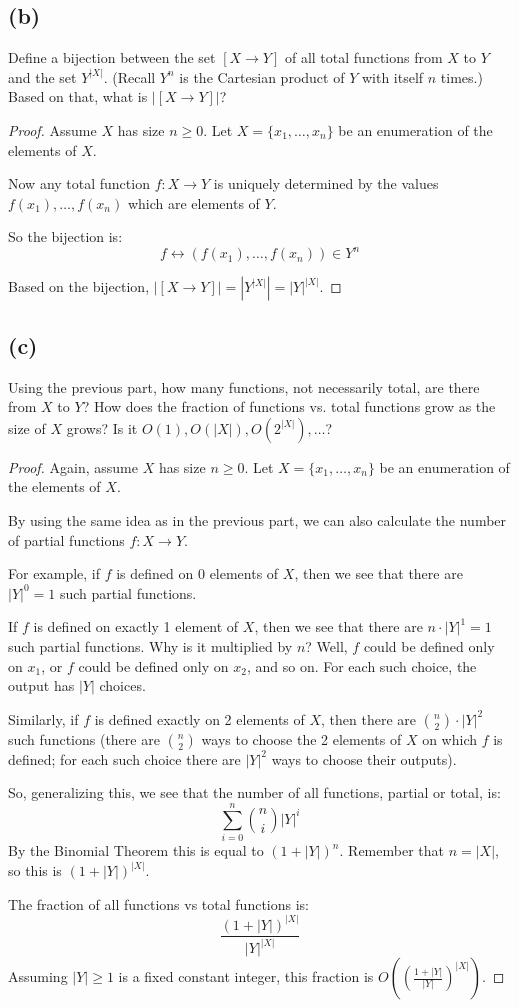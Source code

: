 \documentclass[14pt]{extarticle}
\begin{document}
\subsection{(b)}
Define a bijection between the set $[X \to Y]$ of all total functions from $X$ to $Y$ and the set $Y^{|X|}$. (Recall $Y^n$ is the Cartesian product of $Y$ with itself $n$ times.) Based on that, what is $|[X \to Y]|$?
\begin{proof}
Assume $X$ has size $n\geq 0$. Let $X = \{x_1, \ldots, x_n\}$ be an enumeration of the elements of $X$. 

Now any total function $f: X \to Y$ is uniquely determined by the values\\ $f(x_1),  \ldots, f(x_n)$ which are elements of $Y$.

So the bijection is:
$$
f \longleftrightarrow (f(x_1), \ldots, f(x_n)) \in Y^n
$$

Based on the bijection, $|[X \to Y]| = |Y^{|X|}| = |Y|^{|X|}$.
\end{proof}

\subsection{(c)}
Using the previous part, how many functions, not necessarily total, are there from $X$ to $Y$? How does the fraction of functions vs. total functions grow as the size of $X$ grows? Is it $O(1), O(|X|), O(2^{|X|}), \ldots$?
\begin{proof}
Again, assume $X$ has size $n\geq 0$. Let $X = \{x_1, \ldots, x_n\}$ be an enumeration of the elements of $X$. 

By using the same idea as in the previous part, we can also calculate the number of partial functions $f: X \to Y$.

For example, if $f$ is defined on 0 elements of $X$, then we see that there are $|Y|^0 = 1$ such partial functions.

If $f$ is defined on exactly 1 element of $X$, then we see that there are $n \cdot |Y|^1 = 1$ such partial functions. Why is it multiplied by $n$? Well, $f$ could be defined only on $x_1$, or $f$ could be defined only on $x_2$, and so on. For each such choice, the output has $|Y|$ choices.

Similarly, if $f$ is defined exactly on 2 elements of $X$, then there are $\binom{n}{2}\cdot |Y|^2$ such functions (there are $\binom{n}{2}$ ways to choose the 2 elements of $X$ on which $f$ is defined; for each such choice there are $|Y|^2$ ways to choose their outputs).

So, generalizing this, we see that the number of all functions, partial or total, is:
$$
\sum_{i = 0}^n \binom{n}{i}|Y|^i
$$
By the Binomial Theorem this is equal to $(1+|Y|)^n$. Remember that $n = |X|$, so this is $(1+|Y|)^{|X|}$.

The fraction of all functions vs total functions is:
$$
\frac{(1+|Y|)^{|X|}}{|Y|^{|X|}}
$$
Assuming $|Y| \geq 1$ is a fixed constant integer, this fraction is $O\left(\left(\frac{1+|Y|}{|Y|}\right)^{|X|}\right)$.
\end{proof}
\end{document}
